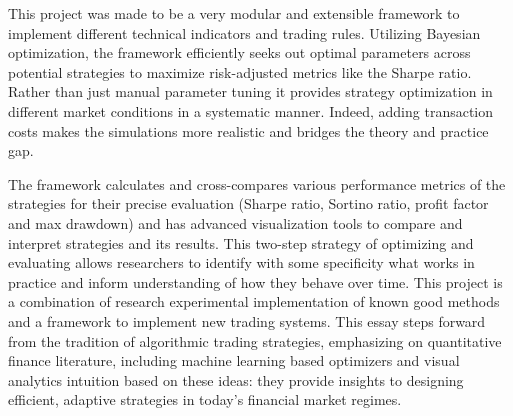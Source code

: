 This project was made to be a very modular and extensible framework to implement different technical indicators and trading rules. Utilizing Bayesian optimization, the framework efficiently seeks out optimal parameters across potential strategies to maximize risk-adjusted metrics like the Sharpe ratio. Rather than just manual parameter tuning it provides strategy optimization in different market conditions in a systematic manner. Indeed, adding transaction costs makes the simulations more realistic and bridges the theory and practice gap.

The framework calculates and cross-compares various performance metrics of the strategies for their precise evaluation (Sharpe ratio, Sortino ratio, profit factor and max drawdown) and has advanced visualization tools to compare and interpret strategies and its results. This two-step strategy of optimizing and evaluating allows researchers to identify with some specificity what works in practice and inform understanding of how they behave over time. This project is a combination of research experimental implementation of known good methods and a framework to implement new trading systems. This essay steps forward from the tradition of algorithmic trading strategies, emphasizing on quantitative finance literature, including machine learning based optimizers and visual analytics intuition based on these ideas: they provide insights to designing efficient, adaptive strategies in today's financial market regimes.


